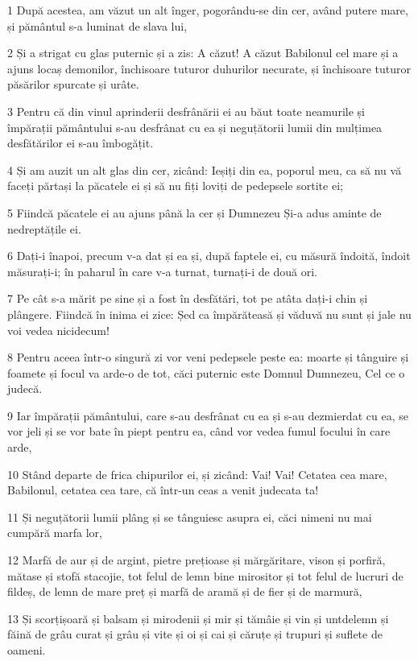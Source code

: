 \par 1 După acestea, am văzut un alt înger, pogorându-se din cer, având putere mare, și pământul s-a luminat de slava lui,
\par 2 Și a strigat cu glas puternic și a zis: A căzut! A căzut Babilonul cel mare și a ajuns locaș demonilor, închisoare tuturor duhurilor necurate, și închisoare tuturor păsărilor spurcate și urâte.
\par 3 Pentru că din vinul aprinderii desfrânării ei au băut toate neamurile și împărații pământului s-au desfrânat cu ea și neguțătorii lumii din mulțimea desfătărilor ei s-au îmbogățit.
\par 4 Și am auzit un alt glas din cer, zicând: Ieșiți din ea, poporul meu, ca să nu vă faceți părtași la păcatele ei și să nu fiți loviți de pedepsele sortite ei;
\par 5 Fiindcă păcatele ei au ajuns până la cer și Dumnezeu Și-a adus aminte de nedreptățile ei.
\par 6 Dați-i înapoi, precum v-a dat și ea și, după faptele ei, cu măsură îndoită, îndoit măsurați-i; în paharul în care v-a turnat, turnați-i de două ori.
\par 7 Pe cât s-a mărit pe sine și a fost în desfătări, tot pe atâta dați-i chin și plângere. Fiindcă în inima ei zice: Șed ca împărăteasă și văduvă nu sunt și jale nu voi vedea nicidecum!
\par 8 Pentru aceea într-o singură zi vor veni pedepsele peste ea: moarte și tânguire și foamete și focul va arde-o de tot, căci puternic este Domnul Dumnezeu, Cel ce o judecă.
\par 9 Iar împărații pământului, care s-au desfrânat cu ea și s-au dezmierdat cu ea, se vor jeli și se vor bate în piept pentru ea, când vor vedea fumul focului în care arde,
\par 10 Stând departe de frica chipurilor ei, și zicând: Vai! Vai! Cetatea cea mare, Babilonul, cetatea cea tare, că într-un ceas a venit judecata ta!
\par 11 Și neguțătorii lumii plâng și se tânguiesc asupra ei, căci nimeni nu mai cumpără marfa lor,
\par 12 Marfă de aur și de argint, pietre prețioase și mărgăritare, vison și porfiră, mătase și stofă stacojie, tot felul de lemn bine mirositor și tot felul de lucruri de fildeș, de lemn de mare preț și marfă de aramă și de fier și de marmură,
\par 13 Și scorțișoară și balsam și mirodenii și mir și tămâie și vin și untdelemn și făină de grâu curat și grâu și vite și oi și cai și căruțe și trupuri și suflete de oameni.

